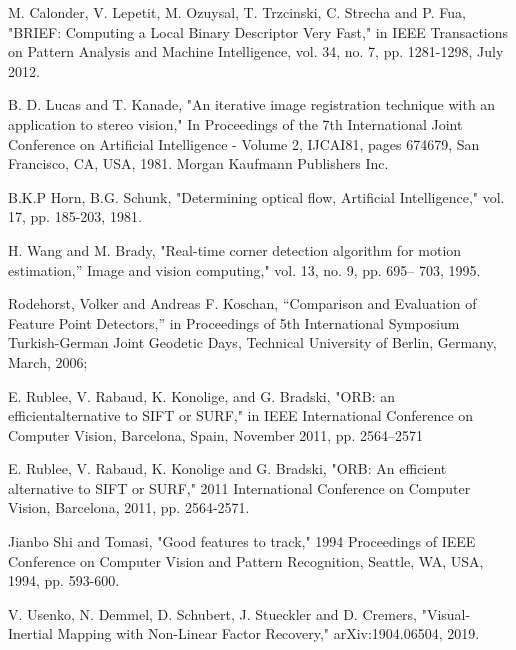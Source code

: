 \documentclass[11pt]{easychair}
\begin{document}
\begin{thebibliography}{00}
	
 	
	M. Calonder, V. Lepetit, M. Ozuysal, T. Trzcinski, C. Strecha and P. Fua, "BRIEF: Computing a Local Binary Descriptor Very Fast," in IEEE Transactions on Pattern Analysis and Machine Intelligence, vol. 34, no. 7, pp. 1281-1298, July 2012.
	
	 B. D. Lucas and T. Kanade, "An iterative image registration technique
	with an application to stereo vision," In Proceedings of the 7th International
	Joint Conference on Artificial Intelligence - Volume 2, IJCAI81,
	pages 674679, San Francisco, CA, USA, 1981. Morgan Kaufmann
	Publishers Inc.
	
	 B.K.P Horn, B.G. Schunk, "Determining optical flow, Artificial Intelligence,"
	vol. 17, pp. 185-203, 1981.
	
	
	 H. Wang and M. Brady, "Real-time corner detection algorithm for
	motion estimation,” Image and vision computing," vol. 13, no. 9, pp. 695–
	703, 1995.
	
	 Rodehorst, Volker and Andreas F. Koschan, “Comparison and Evaluation of Feature Point Detectors,” in Proceedings
	of 5th International Symposium Turkish-German Joint Geodetic Days, Technical University of
	Berlin, Germany, March, 2006; 
		
	 E. Rublee, V. Rabaud, K. Konolige, and G. Bradski, "ORB: an efficientalternative  to  SIFT  or  SURF,"  in IEEE  International  Conference  on Computer Vision, Barcelona, Spain, November 2011, pp. 2564–2571
	
	 E. Rublee, V. Rabaud, K. Konolige and G. Bradski, "ORB: An efficient alternative to SIFT or SURF," 2011 International Conference on Computer Vision, Barcelona, 2011, pp. 2564-2571.
	
	 Jianbo Shi and Tomasi, "Good features to track," 1994 Proceedings of IEEE Conference on Computer Vision and Pattern Recognition, Seattle, WA, USA, 1994, pp. 593-600.

	 V. Usenko, N. Demmel, D. Schubert, J. Stueckler and D. Cremers, "Visual-Inertial Mapping with Non-Linear Factor Recovery," arXiv:1904.06504, 2019.

	
	
	
\end{thebibliography}
\end{document}
